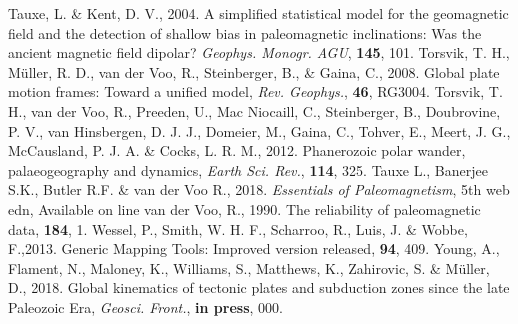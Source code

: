 \begin{thebibliography}{}
  Tauxe, L. \& Kent, D. V., 2004. A simplified statistical model for the
  geomagnetic field and the detection of shallow bias in paleomagnetic
  inclinations: Was the ancient magnetic field dipolar? \textit{Geophys.
  Monogr. AGU}, \textbf{145}, 101.
  Torsvik, T. H., M{\"{u}}ller, R. D., van der Voo, R., Steinberger, B., \&
  Gaina, C., 2008. Global plate motion frames: Toward a unified model,
  \textit{Rev. Geophys.}, \textbf{46}, RG3004.
  Torsvik, T. H., van der Voo, R., Preeden, U., Mac Niocaill, C., Steinberger,
  B., Doubrovine, P. V., van Hinsbergen, D. J. J., Domeier, M., Gaina, C.,
  Tohver, E., Meert, J. G., McCausland, P. J. A. \& Cocks, L. R. M., 2012.
  Phanerozoic polar wander, palaeogeography and dynamics, \textit{Earth Sci.
  Rev.}, \textbf{114}, 325.
  Tauxe L., Banerjee S.K., Butler R.F. \& van der Voo R., 2018.
  \textit{Essentials of Paleomagnetism}, 5th web edn, Available on line
  van der Voo, R., 1990. The reliability of paleomagnetic data,
  \tecto{}\textbf{184}, 1.
  Wessel, P., Smith, W. H. F., Scharroo, R., Luis, J. \& Wobbe, F.,2013. Generic
  Mapping Tools: Improved version released, \eos{}\textbf{94}, 409.
  Young, A., Flament, N., Maloney, K., Williams, S., Matthews, K., Zahirovic, S.
  \& Müller, D., 2018. Global kinematics of tectonic plates and subduction zones
  since the late Paleozoic Era, \textit{Geosci. Front.},
  \textbf{in press}, 000.
\end{thebibliography}~\label{lastpage}

